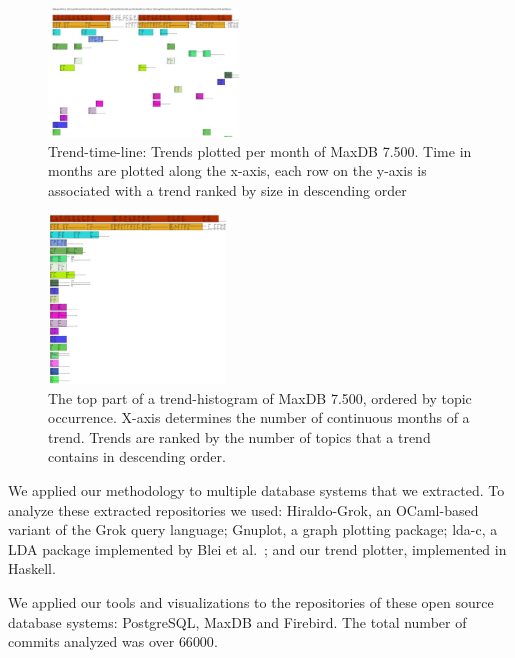 \documentclass[times, 10pt,twocolumn]{article}
\newcommand{\shrinkit}{\vspace*{-.3em}}
\begin{document}
\begin{figure}
  \centering
  \includegraphics[width=0.45\textwidth]{class-smear-plot-crop-scaled}
  \caption{Trend-time-line: Trends plotted per month of MaxDB 7.500. Time in months are plotted along the x-axis, each row on the y-axis is associated with a trend ranked by size in descending order}         
  \label{fig:trendtimeline}
\end{figure}


\begin{figure}
  \centering
  \includegraphics[width=0.42\textwidth]{histogram-cropped-scaled}
  \caption{The top part of a trend-histogram of MaxDB 7.500, ordered
    by topic occurrence. X-axis determines the number of continuous
    months of a trend. Trends are ranked by the number of topics that
    a trend contains in descending order.}
  \label{fig:histogram}
\end{figure}



\shrinkit
{}
\shrinkit

We applied our methodology to multiple database systems that we
extracted.  To analyze these extracted repositories we used:
Hiraldo-Grok, an OCaml-based variant of the Grok query language;
Gnuplot, a graph plotting package; lda-c, a LDA package implemented by
Blei et al.~\cite{944937}; and our trend plotter, implemented in
Haskell.

We applied our tools and visualizations to the repositories of these
open source database systems: PostgreSQL, MaxDB and Firebird. The
total number of commits analyzed was over $66 000$.
\end{document}
